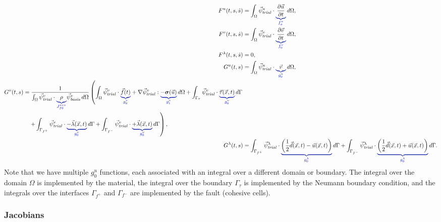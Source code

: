 \begin{align}
  F^u(t,s,\dot{s}) &= \int_\Omega \trialvec[u] \cdot \eqnannotate{\frac{\partial \vec{u}}{\partial t}}{f_o^u} \, d\Omega, \\
  F^v(t,s,\dot{s}) &= \int_\Omega \trialvec[v] \cdot \eqnannotate{\frac{\partial \vec{v}}{\partial t}}{f_0^v}  \, d\Omega, \\
  F^\lambda(t,s,\dot{s}) &= 0, \\
  G^u(t,s) &= \int_\Omega \trialvec[u] \cdot \eqnannotate{\vec{v}}{g_0^u} \, d\Omega, \\
  \begin{split}
  G^v(t,s) &= \frac{1}{\int_\Omega \trialvec[v] \cdot {\eqnannotate{\rho}{J_{f0}^{*vv}}}
    \basisvec[v] \, d\Omega} 
  \left( \int_\Omega \trialvec[v] \cdot \eqnannotate{\vec{f}(t)}{g_0^v} + \nabla \trialvec[v] : 
  \eqnannotate{-\tensor{\sigma}(\vec{u})}{g_1^v} \, d\Omega
  + \int_{\Gamma_\tau} \trialvec[v] \cdot \eqnannotate{\vec{\tau} (\vec{x},t)}{g_0^v} \, d\Gamma \right. \\
  &\quad\left. + \int_{\Gamma_{f^+}} \trialvec[v] \cdot \eqnannotate{-\vec{\lambda}(\vec{x},t)}{g_0^v} \, d\Gamma
  + \int_{\Gamma_{f^-}} \trialvec[v] \cdot \eqnannotate{+\vec{\lambda}(\vec{x},t)}{g_0^v} \, d\Gamma \right),
  \end{split} \\
  G^\lambda(t,s) &= 
\int_{\Gamma_{f^+}} \trialvec[\lambda] \cdot \eqnannotate{\left( \frac{1}{2}\vec{d}(\vec{x},t) - \vec{u}(\vec{x},t) \right)}{g_0^\lambda} \, d\Gamma
    + \int_{\Gamma_{f^-}} \trialvec[\lambda] \cdot \eqnannotate{\left( \frac{1}{2}\vec{d}(\vec{x},t) + \vec{u}(\vec{x},t) \right)}{g_0^\lambda} \, d\Gamma.
\end{align}
Note that we have multiple $g_0^u$ functions, each associated with an
integral over a different domain or boundary. The integral over the
domain $\Omega$ is implemented by the material, the integral over the
boundary $\Gamma_\tau$ is implemented by the Neumann boundary
condition, and the integrals over the interfaces $\Gamma_{f^+}$ and
$\Gamma_{f^-}$ are implemented by the fault (cohesive cells).


\subsubsection{Jacobians}

